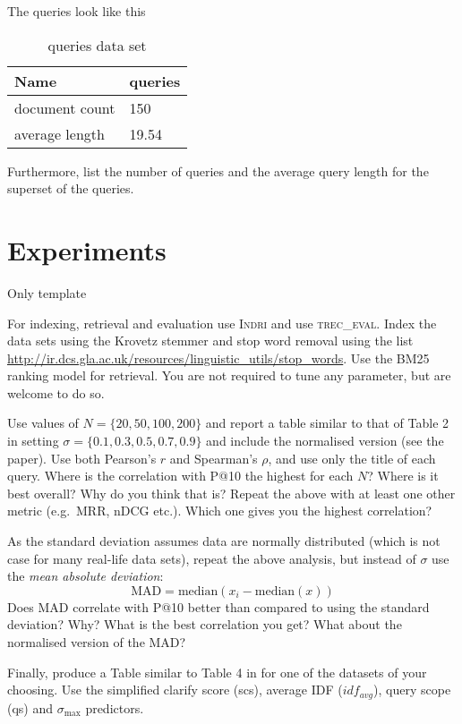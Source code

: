 \documentclass{sig-alternate}
\begin{document}
The queries look like this
\begin{table}[h!]
\centering
\caption{queries data set}
\label{my-label}
\begin{tabular}{|l|l|}
\hline
Name           & queries \\ \hline
document count & 150     \\ \hline
average length & 19.54   \\ \hline
\end{tabular}
\end{table}

Furthermore, list the number of queries and the average query length for the superset of the queries.

\section{Experiments}
Only template

For indexing, retrieval and evaluation use \textsc{Indri} and use \textsc{trec\_eval}. Index the data sets using the Krovetz stemmer and stop word removal using the list \url{http://ir.dcs.gla.ac.uk/resources/linguistic_utils/stop_words}. Use the BM25 ranking model for retrieval. You are not required to tune any parameter, but are welcome to do so.

Use values of $N=\{20,50,100,200\}$ and report a table similar to that of Table 2 in \cite{cummins2011improved} setting $\sigma=\{0.1,0.3,0.5,0.7,0.9\}$ and include the normalised version (see the paper). Use both Pearson's $r$ and Spearman's $\rho$, and use only the title of each query. Where is the correlation with P@10 the highest for each $N$? Where is it best overall? Why do you think that is? Repeat the above with at least one other metric (e.g.\ MRR, nDCG etc.). Which one gives you the highest correlation?

As the standard deviation assumes data are normally distributed (which is not case for many real-life data sets), repeat the above analysis, but instead of $\sigma$ use the \emph{mean absolute deviation}:
\begin{equation}
\text{MAD} = \text{median}\left(x_i - \text{median}(x)\right)
\end{equation}
Does MAD correlate with P@10 better than compared to using the standard deviation? Why? What is the best correlation you get? What about the normalised version of the MAD?

Finally, produce a Table similar to Table 4 in \cite{cummins2011improved} for one of the datasets of your choosing. Use the simplified clarify score (scs), average IDF ($idf_{avg}$), query scope (qs) and $\sigma_{\max}$ predictors. 
\end{document}
